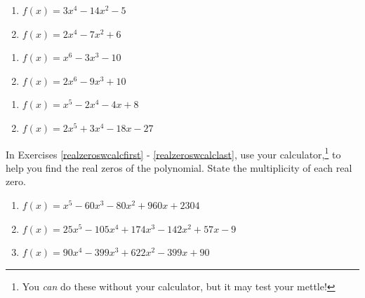 \begin{multicols}{2}
\begin{enumerate}
\setcounter{enumi}{\value{HW}}

\item $f(x) = 3x^4-14x^2-5$
\item $f(x) = 2x^4-7x^2+6$

\setcounter{HW}{\value{enumi}}
\end{enumerate}
\end{multicols}

\begin{multicols}{2}
\begin{enumerate}
\setcounter{enumi}{\value{HW}}

\item $f(x) = x^6-3x^3-10$
\item $f(x) = 2x^6-9x^3+10$

\setcounter{HW}{\value{enumi}}
\end{enumerate}
\end{multicols}

\begin{multicols}{2}
\begin{enumerate}
\setcounter{enumi}{\value{HW}}

\item $f(x) = x^5-2x^4-4x+8$
\item $f(x) = 2x^5+3x^4-18x-27$ \label{findrealzerosexerlast}

\setcounter{HW}{\value{enumi}}
\end{enumerate}
\end{multicols}

\pagebreak

In Exercises \ref{realzeroswcalcfirst} - \ref{realzeroswcalclast}, use your calculator,\footnote{You \textit{can} do these without your calculator, but it may test your mettle!} to help you find the real zeros of the polynomial.  State the multiplicity of each real zero.

\begin{enumerate}
\setcounter{enumi}{\value{HW}}

\item $f(x) = x^{5} - 60x^{3} - 80x^{2} + 960x + 2304$ \label{realzeroswcalcfirst}
\item $f(x) = 25x^{5} - 105x^{4} + 174x^{3} - 142x^{2} + 57x - 9$
\item $f(x) = 90x^{4} - 399x^{3} + 622x^{2} - 399x + 90$ \label{realzeroswcalclast}

\setcounter{HW}{\value{enumi}}
\end{enumerate}

